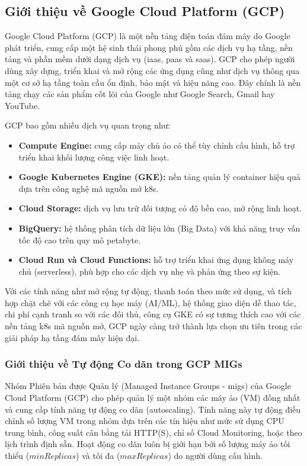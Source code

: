 \subsection{Giới thiệu về Google Cloud Platform (GCP)}

Google Cloud Platform (GCP) là một nền tảng điện toán đám mây do Google phát triển, cung cấp một hệ sinh thái phong phú gồm các dịch vụ hạ tầng, nền tảng và phần mềm dưới dạng dịch vụ (\gls{iaas}, \gls{paas} và \gls{saas}). GCP cho phép người dùng xây dựng, triển khai và mở rộng các ứng dụng cũng như dịch vụ thông qua một cơ sở hạ tầng toàn cầu ổn định, bảo mật và hiệu năng cao. Đây chính là nền tảng chạy các sản phẩm cốt lõi của Google như Google Search, Gmail hay YouTube.

GCP bao gồm nhiều dịch vụ quan trọng như:

\begin{itemize}
    \item \textbf{Compute Engine:} cung cấp máy chủ ảo có thể tùy chỉnh cấu hình, hỗ trợ triển khai khối lượng công việc linh hoạt.
    \item \textbf{Google Kubernetes Engine (GKE):} nền tảng quản lý container hiệu quả dựa trên công nghệ mã nguồn mở \acrfull{k8s}.
    \item \textbf{Cloud Storage:} dịch vụ lưu trữ đối tượng có độ bền cao, mở rộng linh hoạt.
    \item \textbf{BigQuery:} hệ thống phân tích dữ liệu lớn (Big Data) với khả năng truy vấn tốc độ cao trên quy mô petabyte.
    \item \textbf{Cloud Run và Cloud Functions:} hỗ trợ triển khai ứng dụng không máy chủ (serverless), phù hợp cho các dịch vụ nhẹ và phản ứng theo sự kiện.
\end{itemize}

Với các tính năng như mở rộng tự động, thanh toán theo mức sử dụng, và tích hợp chặt chẽ với các công cụ học máy (AI/ML), hệ thống giao diện dễ thao tác, chi phí cạnh tranh so với các đối thủ, công cụ GKE có sự tương thích cao với các nền tảng \acrfull{k8s} mã nguồn mở, GCP ngày càng trở thành lựa chọn ưu tiên trong các giải pháp hạ tầng đám mây hiện đại.

\subsubsection{Giới thiệu về Tự động Co dãn trong GCP MIGs}

Nhóm Phiên bản được Quản lý (Managed Instance Groups - \gls{mig}s) của Google Cloud Platform (GCP) cho phép quản lý một nhóm các máy ảo (VM) đồng nhất và cung cấp tính năng tự động co dãn (autoscaling). Tính năng này tự động điều chỉnh số lượng VM trong nhóm dựa trên các tín hiệu như mức sử dụng CPU trung bình, công suất cân bằng tải HTTP(S), chỉ số Cloud Monitoring, hoặc theo lịch trình định sẵn. Hoạt động co dãn luôn bị giới hạn bởi số lượng máy ảo tối thiểu ($minReplicas$) và tối đa ($maxReplicas$) do người dùng cấu hình.


